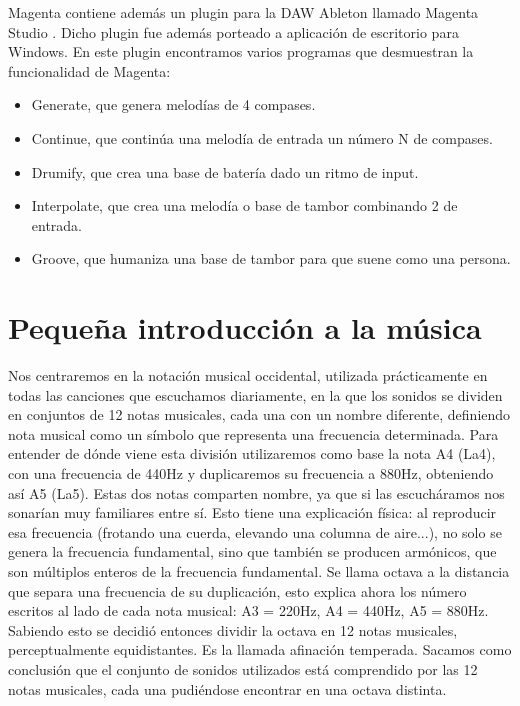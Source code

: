     Magenta contiene además un plugin para la DAW Ableton llamado Magenta Studio \citep{MagentaStudio}. Dicho plugin fue además porteado a aplicación de escritorio para Windows. En este plugin encontramos varios programas que desmuestran la funcionalidad de Magenta: 
    \begin{itemize}
        \item Generate, que genera melodías de 4 compases.
        \item Continue, que continúa una melodía de entrada un número N de compases.
        \item Drumify, que crea una base de batería dado un ritmo de input.
        \item Interpolate, que crea una melodía o base de tambor combinando 2 de entrada.
        \item Groove, que humaniza una base de tambor para que suene como una persona.
    \end{itemize}


\section{Pequeña introducción a la música}\label{sec:arm:armonia}

\label{arm:notas_musicales}
Nos centraremos en la notación musical occidental, utilizada prácticamente en todas las canciones que escuchamos diariamente, en la que los sonidos se dividen en conjuntos de 12 notas musicales, cada una con un nombre diferente, definiendo nota musical como un símbolo que representa una frecuencia determinada. Para entender de dónde viene esta división utilizaremos como base la nota A4 (La4), con una frecuencia de 440Hz y duplicaremos su frecuencia a 880Hz, obteniendo así A5 (La5). Estas dos notas comparten nombre, ya que si las escucháramos nos sonarían muy familiares entre sí. Esto tiene una explicación física: al reproducir esa frecuencia (frotando una cuerda, elevando una columna de aire...), no solo se genera la frecuencia fundamental, sino que también se producen armónicos, que son múltiplos enteros de la frecuencia fundamental. Se llama octava a la distancia que separa una frecuencia de su duplicación, esto explica ahora los número escritos al lado de cada nota musical: A3 = 220Hz, A4 = 440Hz, A5 = 880Hz. Sabiendo esto se decidió entonces dividir la octava en 12 notas musicales, perceptualmente equidistantes. Es la llamada afinación temperada. Sacamos como conclusión que el conjunto de sonidos utilizados está comprendido por las 12 notas musicales, cada una pudiéndose encontrar en una octava distinta. 

